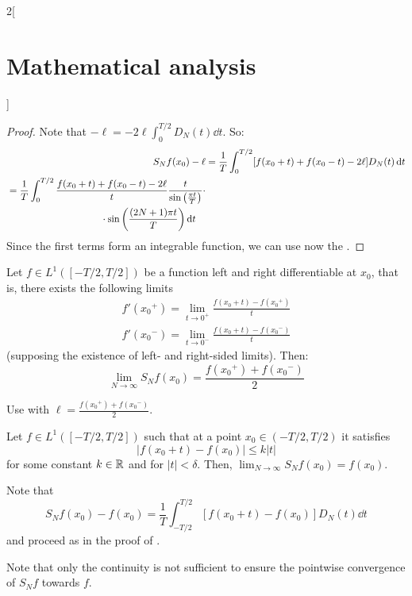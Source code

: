 \documentclass[../../../main_math.tex]{subfiles}
\begin{document}
\begin{multicols}{2}[\section{Mathematical analysis}]
\begin{theorem}
  \end{theorem}
  \begin{proof}
    Note that $-\ell=-2\ell\int_{0}^{T/2}D_N(t)\dd{t}$. So:
    \begin{align*}
      S_Nf(x_0)-\ell & =\frac{1}{T}\int_0^{T/2}[f(x_0+t)+f(x_0-t) - 2\ell]D_N(t)\dd{t} \\
      \begin{split}
        &=\frac{1}{T}\int_{0}^{T/2}\frac{f(x_0+t)+f(x_0-t) - 2\ell}{t}\frac{t}{\sin\left(\frac{\pi t}{T}\right)}\cdot\\
        &\hspace{3.4cm}\cdot\sin\left(\frac{(2N+1)\pi t}{T}\right)\dd{t}
      \end{split}
    \end{align*}
    Since the first terms form an integrable function, we can use now the .
  \end{proof}
  \begin{corollary}
    Let $f\in L^1([-T/2,T/2])$ be a function left and right differentiable at $x_0$, that is, there exists the following limits
    \begin{gather*}
      f'({x_0}^+)=\lim_{t\to0^+}\frac{f(x_0+t)-f({x_0}^+)}{t}\\
      f'({x_0}^-)=\lim_{t\to0^-}\frac{f(x_0+t)-f({x_0}^-)}{t}
    \end{gather*}(supposing the existence of left- and right-sided limits). Then: $$\lim_{N\to\infty}S_Nf(x_0)=\frac{f({x_0}^+)+f({x_0}^-)}{2}$$
  \end{corollary}
  \begin{sproof}
    Use  with $\ell=\frac{f({x_0}^+)+f({x_0}^-)}{2}$.
  \end{sproof}
  \begin{theorem}
    Let $f\in L^1([-T/2,T/2])$ such that at a point $x_0\in (-T/2,T/2)$ it satisfies $$|f(x_0+t)-f(x_0)|\leq k|t|$$ for some constant $k\in\mathbb{R} $ and for $|t|<\delta$. Then, $\displaystyle\lim_{N\to\infty}S_Nf(x_0)=f(x_0)$.
  \end{theorem}
  \begin{sproof}
    Note that
    $$S_Nf(x_0)-f(x_0) =\frac{1}{T}\int_{-T/2}^{T/2}[f(x_0+t) - f(x_0)]D_N(t)\dd{t}$$
    and proceed as in the proof of .
  \end{sproof}
  \begin{remark}
    Note that only the continuity is not sufficient to ensure the pointwise convergence of $S_Nf$ towards $f$.
  \end{remark}

\end{multicols}
\end{document}
